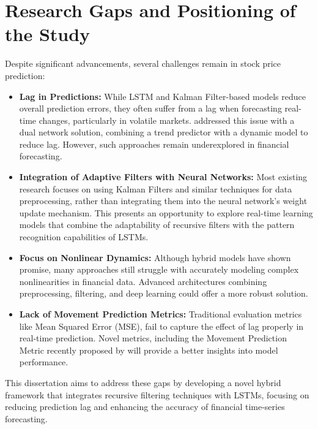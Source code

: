\section{Research Gaps and Positioning of the Study}
Despite significant advancements, several challenges remain in stock price prediction:
\begin{itemize}
    \item \textbf{Lag in Predictions:} While LSTM and Kalman Filter-based models reduce overall prediction errors, they often suffer from a lag when forecasting real-time changes, particularly in volatile markets. \textcite{samanta_dual_2020} addressed this issue with a dual network solution, combining a trend predictor with a dynamic model to reduce lag. However, such approaches remain underexplored in financial forecasting.
    
    \item \textbf{Integration of Adaptive Filters with Neural Networks:} Most existing research focuses on using Kalman Filters and similar techniques for data preprocessing, rather than integrating them into the neural network's weight update mechanism. This presents an opportunity to explore real-time learning models that combine the adaptability of recursive filters with the pattern recognition capabilities of LSTMs.

    \item \textbf{Focus on Nonlinear Dynamics:} Although hybrid models have shown promise, many approaches still struggle with accurately modeling complex nonlinearities in financial data. Advanced architectures combining preprocessing, filtering, and deep learning could offer a more robust solution.

    \item \textbf{Lack of Movement Prediction Metrics:} Traditional evaluation metrics
like Mean Squared Error (MSE), fail to capture the effect of lag properly in real-time prediction. Novel metrics, including the Movement Prediction Metric recently proposed by  \textcite{samanta_dual_2020} will provide a better
insights into model performance.
\end{itemize}

This dissertation aims to address these gaps by developing a novel hybrid framework that integrates recursive filtering techniques with LSTMs, focusing on reducing prediction lag and enhancing the accuracy of financial time-series forecasting.